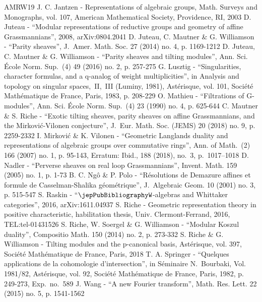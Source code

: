 \begin{thebibliography}{AMRW19}
 J. C. Jantzen - Representations of algebraic groups, Math. Surveys and Monographs, vol. 107, American Mathematical Society, Providence, RI, 2003
 D. Juteau - “Modular representations of reductive groups and geometry of affine Grassmannians”, 2008, arXiv:0804.2041
 D. Juteau, C. Mautner \& G. Williamson - “Parity sheaves”, J. Amer. Math. Soc. 27 (2014) no. 4, p. 1169-1212
 D. Juteau, C. Mautner \& G. Williamson - “Parity sheaves and tilting modules”, Ann. Sci. École Norm. Sup. (4) 49 (2016) no. 2, p. 257-275
 G. Lusztig - “Singularities, character formulas, and a q-analog of weight multiplicities”, in Analysis and topology on singular spaces, II, III (Luminy, 1981), Astérisque, vol. 101, Société Mathématique de France, Paris, 1983, p. 208-229
 O. Mathieu - “Filtrations of G-modules”, Ann. Sci. École Norm. Sup. (4) 23 (1990) no. 4, p. 625-644
 C. Mautner \& S. Riche - “Exotic tilting sheaves, parity sheaves on affine Grassmannians, and the Mirković-Vilonen conjecture”, J. Eur. Math. Soc. (JEMS) 20 (2018) no. 9, p. 2259-2332
 I. Mirković \& K. Vilonen - “Geometric Langlands duality and representations of algebraic groups over commutative rings”, Ann. of Math. (2) 166 (2007) no. 1, p. 95-143, Erratum: Ibid., 188 (2018), no. 3, p. 1017–1018
 D. Nadler - “Perverse sheaves on real loop Grassmannians”, Invent. Math. 159 (2005) no. 1, p. 1-73
 B. C. Ngô \& P. Polo - “Résolutions de Demazure affines et formule de Casselman-Shalika géométrique”, J. Algebraic Geom. 10 (2001) no. 3, p. 515-547
 S. Raskin - “$\jepPubBibliographyW$-algebras and Whittaker categories”, 2016, arXiv:1611.04937
 S. Riche - Geometric representation theory in positive characteristic, habilitation thesis, Univ. Clermont-Ferrand, 2016, TEL:tel-01431526
 S. Riche, W. Soergel \& G. Williamson - “Modular Koszul duality”, Compositio Math. 150 (2014) no. 2, p. 273-332
 S. Riche \& G. Williamson - Tilting modules and the p-canonical basis, Astérisque, vol. 397, Société Mathématique de France, Paris, 2018
 T. A. Springer - “Quelques applications de la cohomologie d’intersection”, in Séminaire N. Bourbaki, Vol. 1981/82, Astérisque, vol. 92, Société Mathématique de France, Paris, 1982, p. 249-273, Exp. no. 589
 J. Wang - “A new Fourier transform”, Math. Res. Lett. 22 (2015) no. 5, p. 1541-1562
\end{thebibliography}
